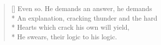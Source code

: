 \label{ch:lear_bh}
\settowidth{\versewidth}{An explanation, cracking thunder and the hard}
\begin{verse}[\versewidth]
Even so. He demands an answer, he demands\\*
An explanation, cracking thunder and the hard\\*
Hearts which crack his own will yield,\\*
He swears, their logic to his logic.
\end{verse}
